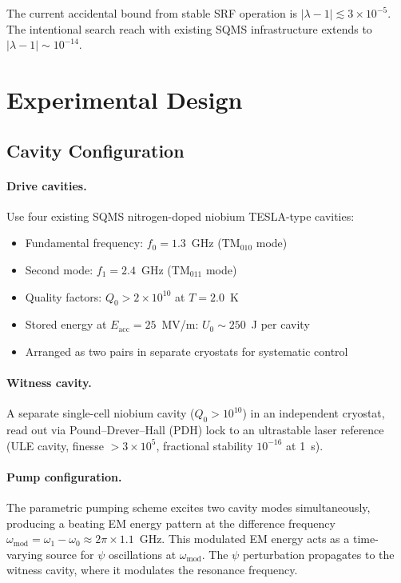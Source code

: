 \documentclass[11pt]{article}
\newcommand{\ee}[1]{\times 10^{#1}}
\newcommand{\lbone}{|\lambda - 1|}
\begin{document}
The current accidental bound from stable SRF operation is
$\lbone \lesssim 3\ee{-5}$.  The intentional search reach with
existing SQMS infrastructure extends to $\lbone \sim 10^{-14}$.

\section{Experimental Design}
\label{sec:srf-design}

\subsection{Cavity Configuration}

\paragraph{Drive cavities.}
Use four existing SQMS nitrogen-doped niobium TESLA-type cavities:
\begin{itemize}[nosep]
\item Fundamental frequency: $f_0 = 1.3$~GHz (TM$_{010}$ mode)
\item Second mode: $f_1 = 2.4$~GHz (TM$_{011}$ mode)
\item Quality factors: $Q_0 > 2\ee{10}$ at $T = 2.0$~K
\item Stored energy at $E_{\text{acc}} = 25$~MV/m: $U_0 \sim 250$~J per cavity
\item Arranged as two pairs in separate cryostats for systematic control
\end{itemize}

\paragraph{Witness cavity.}
A separate single-cell niobium cavity ($Q_0 > 10^{10}$) in an
independent cryostat, read out via Pound--Drever--Hall (PDH) lock
to an ultrastable laser reference (ULE cavity, finesse $> 3\ee{5}$,
fractional stability $10^{-16}$ at 1~s).

\paragraph{Pump configuration.}
The parametric pumping scheme excites two cavity modes simultaneously,
producing a beating EM energy pattern at the difference frequency
$\omega_{\text{mod}} = \omega_1 - \omega_0 \approx 2\pi \times 1.1$~GHz.
This modulated EM energy acts as a time-varying source for $\psi$
oscillations at $\omega_{\text{mod}}$.  The $\psi$ perturbation
propagates to the witness cavity, where it modulates the resonance
frequency.
\end{document}
